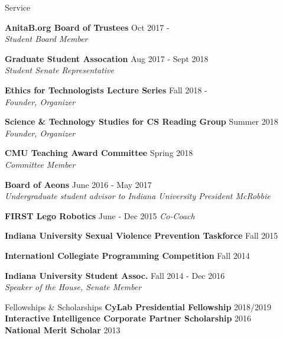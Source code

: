 \documentclass{resume} %
\begin{document}
\newpage
\begin{rSection}{Service}

	{\bf AnitaB.org Board of Trustees} \hfill Oct 2017 - \\ 
	\textit{Student Board Member} 

	{\bf Graduate Student Assocation} \hfill Aug 2017 - Sept 2018 \\ 
	\textit{Student Senate Representative} 

	{\bf Ethics for Technologists Lecture Series} \hfill Fall 2018 - \\ 
	\textit{Founder, Organizer} 

	{\bf Science \& Technology Studies for CS Reading Group} \hfill Summer 2018 \\ 
	\textit{Founder, Organizer} 
	
	{\bf CMU Teaching Award Committee} \hfill Spring 2018 \\ 
	\textit{Committee Member} 

	{\bf Board of Aeons} \hfill June 2016 - May 2017 \\
	\textit{Undergraduate student advisor to Indiana University President McRobbie}

	{\bf FIRST Lego Robotics} \hfill June - Dec 2015  
	\textit{Co-Coach}

	{\bf Indiana University Sexual Violence Prevention Taskforce} \hfill Fall 2015  

	{\bf Internationl Collegiate Programming Competition} \hfill Fall 2014 

	{\bf Indiana University Student Assoc.} \hfill Fall 2014 - Dec 2016 \\ 
	\textit{Speaker of the House, Senate Member} 

\end{rSection}

\begin{rSection}{Fellowships \& Scholarships}
	{\bf CyLab Presidential Fellowship} \hfill 2018/2019 \\ 
	{\bf Interactive Intelligence Corporate Partner Scholarship} \hfill 2016 \\ 
	{\bf National Merit Scholar} \hfill 2013 \\ 

\end{rSection}
\end{document}
